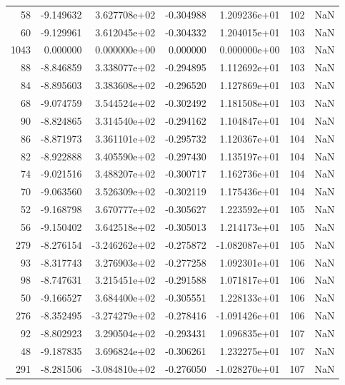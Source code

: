 \begin{tabular}{rrrrrrr}
  58 &  -9.149632 &  3.627708e+02 & -0.304988 &  1.209236e+01 &         102 & NaN \\
  60 &  -9.129961 &  3.612045e+02 & -0.304332 &  1.204015e+01 &         103 & NaN \\
1043 &   0.000000 &  0.000000e+00 &  0.000000 &  0.000000e+00 &         103 & NaN \\
  88 &  -8.846859 &  3.338077e+02 & -0.294895 &  1.112692e+01 &         103 & NaN \\
  84 &  -8.895603 &  3.383608e+02 & -0.296520 &  1.127869e+01 &         103 & NaN \\
  68 &  -9.074759 &  3.544524e+02 & -0.302492 &  1.181508e+01 &         103 & NaN \\
  90 &  -8.824865 &  3.314540e+02 & -0.294162 &  1.104847e+01 &         104 & NaN \\
  86 &  -8.871973 &  3.361101e+02 & -0.295732 &  1.120367e+01 &         104 & NaN \\
  82 &  -8.922888 &  3.405590e+02 & -0.297430 &  1.135197e+01 &         104 & NaN \\
  74 &  -9.021516 &  3.488207e+02 & -0.300717 &  1.162736e+01 &         104 & NaN \\
  70 &  -9.063560 &  3.526309e+02 & -0.302119 &  1.175436e+01 &         104 & NaN \\
  52 &  -9.168798 &  3.670777e+02 & -0.305627 &  1.223592e+01 &         105 & NaN \\
  56 &  -9.150402 &  3.642518e+02 & -0.305013 &  1.214173e+01 &         105 & NaN \\
 279 &  -8.276154 & -3.246262e+02 & -0.275872 & -1.082087e+01 &         105 & NaN \\
  93 &  -8.317743 &  3.276903e+02 & -0.277258 &  1.092301e+01 &         106 & NaN \\
  98 &  -8.747631 &  3.215451e+02 & -0.291588 &  1.071817e+01 &         106 & NaN \\
  50 &  -9.166527 &  3.684400e+02 & -0.305551 &  1.228133e+01 &         106 & NaN \\
 276 &  -8.352495 & -3.274279e+02 & -0.278416 & -1.091426e+01 &         106 & NaN \\
  92 &  -8.802923 &  3.290504e+02 & -0.293431 &  1.096835e+01 &         107 & NaN \\
  48 &  -9.187835 &  3.696824e+02 & -0.306261 &  1.232275e+01 &         107 & NaN \\
 291 &  -8.281506 & -3.084810e+02 & -0.276050 & -1.028270e+01 &         107 & NaN \\

\end{tabular}
